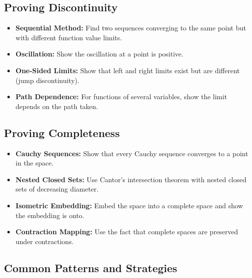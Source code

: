 \subsection*{Proving Discontinuity}

\begin{itemize}
\item \textbf{Sequential Method:} Find two sequences converging to the same point but with different function value limits.

\item \textbf{Oscillation:} Show the oscillation at a point is positive.

\item \textbf{One-Sided Limits:} Show that left and right limits exist but are different (jump discontinuity).

\item \textbf{Path Dependence:} For functions of several variables, show the limit depends on the path taken.
\end{itemize}

\subsection*{Proving Completeness}

\begin{itemize}
\item \textbf{Cauchy Sequences:} Show that every Cauchy sequence converges to a point in the space.

\item \textbf{Nested Closed Sets:} Use Cantor's intersection theorem with nested closed sets of decreasing diameter.

\item \textbf{Isometric Embedding:} Embed the space into a complete space and show the embedding is onto.

\item \textbf{Contraction Mapping:} Use the fact that complete spaces are preserved under contractions.
\end{itemize}

\subsection*{Common Patterns and Strategies}

